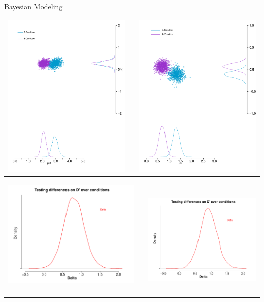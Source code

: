 \documentclass[final]{beamer}
\newlength{\onecolwid}
\newlength{\twocolwid}
\begin{document}
\begin{frame}[t]
\begin{columns}[t]
\begin{column}{\twocolwid}
\begin{columns}[t,totalwidth=\twocolwid]
\begin{column}{\onecolwid}
\begin{alertblock}{Bayesian Modeling}
\begin{enumerate}
\begin{center}
\begin{tabular}{ccc}
\includegraphics[width=0.4\linewidth]{Figures/Modelo_Delta_MeanDC_1.pdf} & \hfill & \includegraphics[width=0.4\linewidth]{Figures/Modelo_Delta_MeanDC_2.pdf}
\end{tabular}
\end{center}

\begin{center}
\begin{tabular}{ccc}
\includegraphics[width=0.25\linewidth]{Figures/Delta_1.pdf}  $\qquad$ $\qquad$ & \hfill & \includegraphics[width=0.25\linewidth]{Figures/Delta_2.pdf}
\end{tabular}
\end{center}




\end{enumerate}
\end{alertblock}
\end{column}
\end{columns}
\end{column}
\end{columns}
\end{frame}
\end{document}
